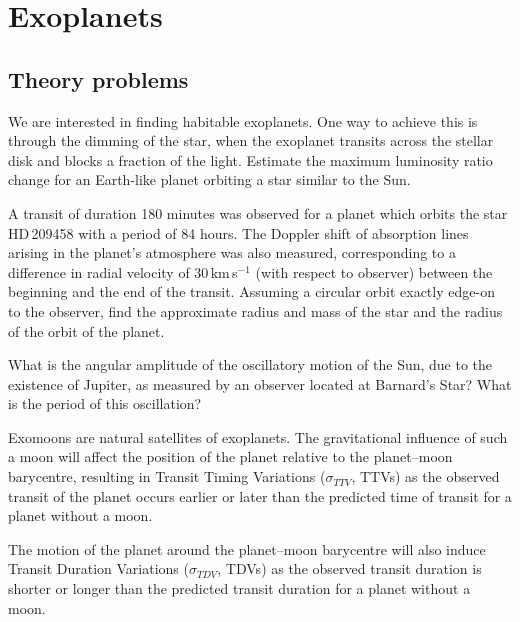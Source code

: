 \chapter{Exoplanets}

\section*{Theory problems}

We are interested in finding habitable exoplanets. One way to achieve this is
through the dimming of the star, when the exoplanet transits across the stellar
disk and blocks a fraction of the light. Estimate the maximum luminosity ratio
change for an Earth-like planet orbiting a star similar to the Sun.

A transit of duration 180 minutes was observed for a planet which orbits the
star HD\,209458 with a period of 84 hours. The Doppler shift of absorption lines
arising in the planet's atmosphere was also measured, corresponding to a
difference in radial velocity of $30$\,km\,s$^{-1}$ (with respect to
observer) between the beginning and the end of the transit. Assuming a circular
orbit exactly edge-on to the observer, find the approximate radius and mass of
the star and the radius of the orbit of the planet.

What is the angular amplitude of the oscillatory motion of the Sun, due to the
existence of Jupiter, as measured by an observer located at Barnard's Star? What
is the period of this oscillation?

Exomoons are natural satellites of exoplanets. The gravitational influence of
such a moon will affect the position of the planet relative to the planet--moon
barycentre, resulting in Transit Timing Variations ($\sigma_{TTV}$, TTVs) as the
observed transit of the planet occurs earlier or later than the predicted time
of transit for a planet without a moon.

The motion of the planet around the planet--moon barycentre will also induce
Transit Duration Variations ($\sigma_{TDV}$, TDVs) as the observed transit
duration is shorter or longer than the predicted transit duration for a planet
without a moon.

